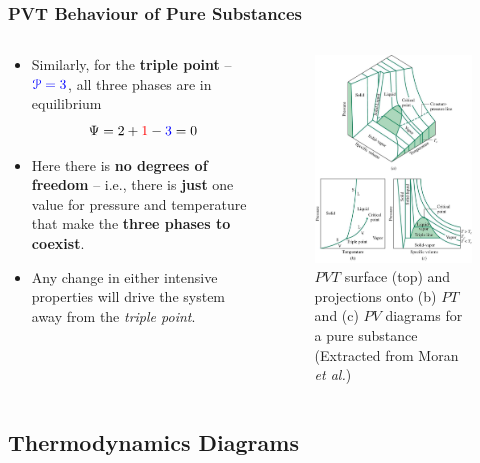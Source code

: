 \documentclass[10pt,compress]{beamer}
\begin{document}
\begin{frame}
 \frametitle{PVT Behaviour of Pure Substances}
 \begin{columns}
  \begin{column}[l]{0.5\linewidth}
\begin{itemize}
\item <1-> Similarly, for the {\bf triple point} -- $\textcolor{blue}{\mathcal{P}=3}$, all three phases are in equilibrium
\begin{displaymath}
\Psi = 2 + \textcolor{red}{1} - \textcolor{blue}{3} = 0
\end{displaymath}
\item <2-> Here there is {\bf no degrees of freedom} -- i.e., there is {\bf just} one value for pressure and temperature that make the {\bf three phases to coexist}.
\item <3-> Any change in either intensive properties will drive the system away from the {\it triple point}.
\end{itemize}
  \end{column}
  \begin{column}[l]{0.5\linewidth}
   \begin{figure}%
    \begin{center}
     \includegraphics[width=4.cm,clip]{./Pics/PVT_Surface.jpg}
    \end{center}
\caption{$PVT$ surface (top) and projections onto (b) $PT$ and (c) $PV$ diagrams for a pure substance (Extracted from Moran {\it et al.})}
   \end{figure}    
  \end{column}
 \end{columns}
\end{frame}


\subsection{Thermodynamics Diagrams}
\end{document}
